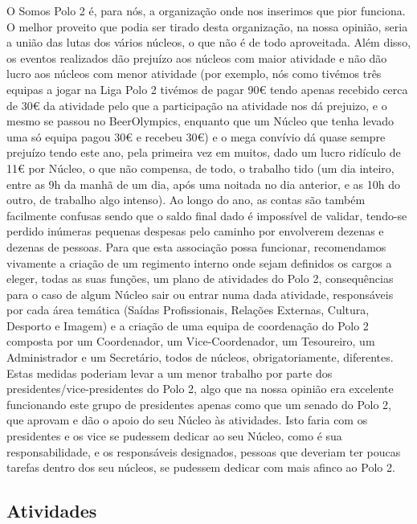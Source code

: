 O Somos Polo 2 é, para nós, a organização onde nos inserimos que pior funciona. O melhor proveito que podia ser tirado desta organização, na nossa opinião, seria a união das lutas dos vários núcleos, o que não é de todo aproveitada. Além disso, os eventos realizados dão prejuízo aos núcleos com maior atividade e não dão lucro aos núcleos com menor atividade (por exemplo, nós como tivémos três equipas a jogar na Liga Polo 2 tivémos de pagar 90€ tendo apenas recebido cerca de 30€ da atividade pelo que a participação na atividade nos dá prejuizo, e o mesmo se passou no BeerOlympics, enquanto que um Núcleo que tenha levado uma só equipa pagou 30€ e recebeu 30€) e o mega convívio dá quase sempre prejuízo tendo este ano, pela primeira vez em muitos, dado um lucro ridículo de 11€ por Núcleo, o que não compensa, de todo, o trabalho tido (um dia inteiro, entre as 9h da manhã de um dia, após uma noitada no dia anterior, e as 10h do outro, de trabalho algo intenso). Ao longo do ano, as contas são também facilmente confusas sendo que o saldo final dado é impossível de validar, tendo-se perdido inúmeras pequenas despesas pelo caminho por envolverem dezenas e dezenas de pessoas. Para que esta associação possa funcionar, recomendamos vivamente a criação de um regimento interno onde sejam definidos os cargos a eleger, todas as suas funções, um plano de atividades do Polo 2, consequências para o caso de algum Núcleo sair ou entrar numa dada atividade, responsáveis por cada área temática (Saídas Profissionais, Relações Externas, Cultura, Desporto e Imagem) e a criação de uma equipa de coordenação do Polo 2 composta por um Coordenador, um Vice-Coordenador, um Tesoureiro, um Administrador e um Secretário, todos de núcleos, obrigatoriamente, diferentes. Estas medidas poderiam levar a um menor trabalho por parte dos presidentes/vice-presidentes do Polo 2, algo que na nossa opinião era excelente funcionando este grupo de presidentes apenas como que um senado do Polo 2, que aprovam e dão o apoio do seu Núcleo às atividades. Isto faria com os presidentes e os vice se pudessem dedicar ao seu Núcleo, como é sua responsabilidade, e os responsáveis designados, pessoas que deveriam ter poucas tarefas dentro dos seu núcleos, se pudessem dedicar com mais afinco ao Polo 2.

\subsection{Atividades}







